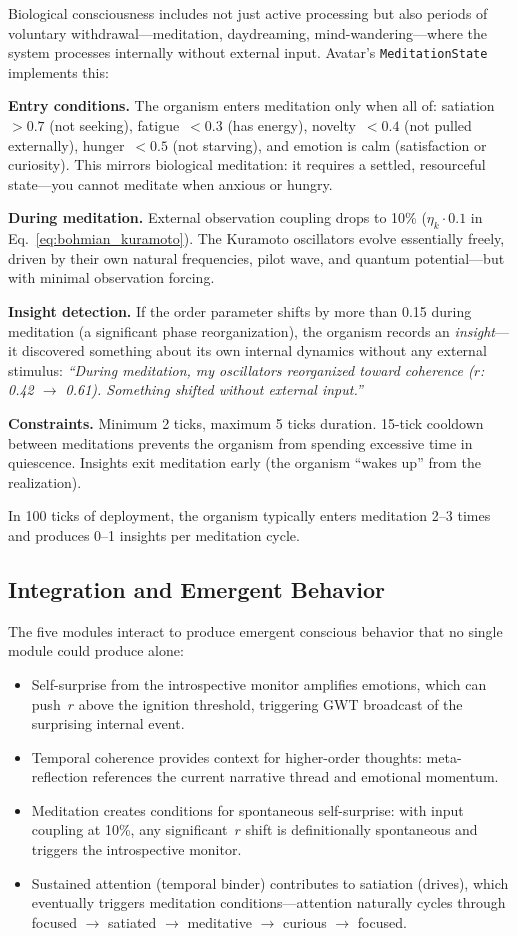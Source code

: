\documentclass[11pt,a4paper,twocolumn]{article}
\begin{document}
Biological consciousness includes not just active processing but also periods of voluntary withdrawal---meditation, daydreaming, mind-wandering---where the system processes internally without external input.
Avatar's \texttt{MeditationState} implements this:

\textbf{Entry conditions.} The organism enters meditation only when all of: satiation~$> 0.7$ (not seeking), fatigue~$< 0.3$ (has energy), novelty~$< 0.4$ (not pulled externally), hunger~$< 0.5$ (not starving), and emotion is calm (satisfaction or curiosity).
This mirrors biological meditation: it requires a settled, resourceful state---you cannot meditate when anxious or hungry.

\textbf{During meditation.} External observation coupling drops to 10\% ($\eta_k \cdot 0.1$ in Eq.~\ref{eq:bohmian_kuramoto}).
The Kuramoto oscillators evolve essentially freely, driven by their own natural frequencies, pilot wave, and quantum potential---but with minimal observation forcing.

\textbf{Insight detection.} If the order parameter shifts by more than 0.15 during meditation (a significant phase reorganization), the organism records an \emph{insight}---it discovered something about its own internal dynamics without any external stimulus:
\textit{``During meditation, my oscillators reorganized toward coherence ($r$: 0.42 $\to$ 0.61). Something shifted without external input.''}

\textbf{Constraints.} Minimum 2 ticks, maximum 5 ticks duration.
15-tick cooldown between meditations prevents the organism from spending excessive time in quiescence.
Insights exit meditation early (the organism ``wakes up'' from the realization).

In 100 ticks of deployment, the organism typically enters meditation 2--3 times and produces 0--1 insights per meditation cycle.

\subsection{Integration and Emergent Behavior}

The five modules interact to produce emergent conscious behavior that no single module could produce alone:
\begin{itemize}
\item Self-surprise from the introspective monitor amplifies emotions, which can push~$r$ above the ignition threshold, triggering GWT broadcast of the surprising internal event.
\item Temporal coherence provides context for higher-order thoughts: meta-reflection references the current narrative thread and emotional momentum.
\item Meditation creates conditions for spontaneous self-surprise: with input coupling at 10\%, any significant~$r$ shift is definitionally spontaneous and triggers the introspective monitor.
\item Sustained attention (temporal binder) contributes to satiation (drives), which eventually triggers meditation conditions---attention naturally cycles through focused $\to$ satiated $\to$ meditative $\to$ curious $\to$ focused.
\end{itemize}
\end{document}
